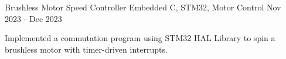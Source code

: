 \begin{project}
  {Brushless Motor Speed Controller}
  {Embedded C, STM32, Motor Control}
  {Nov 2023 - Dec 2023}
  {}

  \item Implemented a commutation program using STM32 HAL Library to spin a brushless motor with
        timer-driven interrupts.

\end{project}
